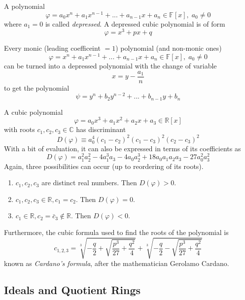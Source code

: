 \documentclass{article}
\begin{document}
      \begin{definition}
        A polynomial 
        \[\varphi = a_0 x^n + a_1 x^{n-1} + ... + a_{n-1} x + a_n \in \mathbb{F}[x], \; a_0 \neq 0\]
        where $a_1 = 0$ is called \textit{depressed}. A depressed cubic polynomial is of form
        \[\varphi = x^3 + p x + q\]
      \end{definition}

      \begin{proposition}
        Every monic (leading coefficeint $=1$) polynomial (and non-monic ones) 
        \[\varphi = x^n + a_1 x^{n-1} + ... + a_{n-1} x + a_n \in \mathbb{F}[x], \; a_0 \neq 0\]
        can be turned into a depressed polynomial with the change of variable
        \[x = y - \frac{a_1}{n}\]
        to get the polynomial 
        \[\psi = y^n + b_2 y^{n-2} + ... + b_{n-1} y + b_n\]
      \end{proposition}

      \begin{lemma}
        A cubic polynomial 
        \[\varphi = a_0 x^3 + a_1 x^2 + a_2 x + a_3 \in \mathbb{R}[x]\]
        with roots $c_1, c_2, c_3 \in \mathbb{C}$ has discriminant
        \[D(\varphi) \equiv a_0^4 (c_1 - c_2)^2 (c_1 - c_3)^2 (c_2 - c_3)^2\]
        With a bit of evaluation, it can also be expressed in terms of its coefficients as
        \[D(\varphi) = a_1^2 a_2^2 - 4a_1^3 a_3 - 4a_0 a_2^3 + 18 a_0 a_1 a_2 a_3 - 27 a_0^2 a_3^2\]
        Again, three possibilities can occur (up to reordering of its roots). 
        \begin{enumerate}
            \item $c_1, c_2, c_3$ are distinct real numbers. Then $D(\varphi) > 0$. 
            \item $c_1, c_2, c_3 \in \mathbb{R}, c_1 = c_2$. Then $D(\varphi) = 0$. 
            \item $c_1 \in \mathbb{R}, c_2 = \bar{c}_3 \not\in \mathbb{R}$. Then $D(\varphi) < 0$. 
        \end{enumerate}
        Furthermore, the cubic formula used to find the roots of the polynomial is 
        \[c_{1, 2, 3} = \sqrt[3]{-\frac{q}{2} + \sqrt{\frac{p^3}{27} + \frac{q^2}{4}}} + \sqrt[3]{-\frac{q}{2} - \sqrt{\frac{p^3}{27} + \frac{q^2}{4}}}\]
        known as \textit{Cardano's formula}, after the mathematician Gerolamo Cardano. 
      \end{lemma}

  \subsection{Ideals and Quotient Rings}
\end{document}
